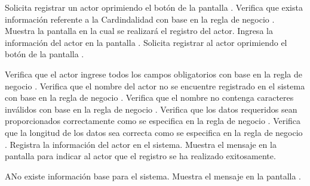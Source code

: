  \begin{UCtrayectoria}
    \UCpaso[\UCactor] Solicita registrar un actor oprimiendo el botón  de la pantalla .
    \UCpaso[\UCsist] Verifica que exista información referente a la Cardindalidad con base en la regla de negocio . 
    \UCpaso[\UCsist] Muestra la pantalla  en la cual se realizará el registro del actor. 
    \UCpaso[\UCactor] Ingresa la información del actor en la pantalla . \label{cu7.1:ingresaDatos}
    \UCpaso[\UCactor] Solicita registrar al actor oprimiendo el botón  de la pantalla . 
    
    \UCpaso[\UCsist] Verifica que el actor ingrese todos los campos obligatorios con base en la regla de negocio  . 
    \UCpaso[\UCsist] Verifica que el nombre del actor no se encuentre registrado en el sistema con base en la regla de negocio  . 
    \UCpaso[\UCsist] Verifica que el nombre no contenga caracteres inválidos con base en la regla de negocio . 
    \UCpaso[\UCsist] Verifica que los datos requeridos sean proporcionados correctamente como se especifica en la regla de negocio .  
    \UCpaso[\UCsist] Verifica que la longitud de los datos sea correcta como se especifica en la regla de negocio . 
    \UCpaso[\UCsist] Registra la información del actor en el sistema.
    \UCpaso[\UCsist] Muestra el mensaje  en la pantalla  
    para indicar al actor que el registro se ha realizado exitosamente.
 \end{UCtrayectoria}
 \begin{UCtrayectoriaA}{A}{No existe información base para el sistema.}
    \UCpaso[\UCsist] Muestra el mensaje  en la pantalla .
 \end{UCtrayectoriaA}
